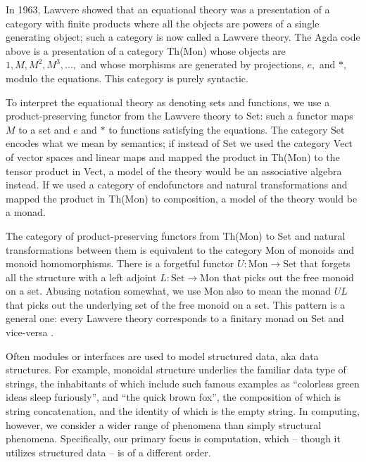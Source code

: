 \documentclass{llncs}
\newcommand{\maps}{\colon}
\newcommand{\Set}{\mathrm{Set}}
\newcommand{\Mon}{\mathrm{Mon}}
\begin{document}
  In 1963, Lawvere \cite{Lawvere} showed that an equational theory was
  a presentation of a category with finite products where all the
  objects are powers of a single generating object; such a category is
  now called a Lawvere theory.  The Agda code above is a presentation
  of a category Th(Mon) whose objects are $1, M, M^2, M^3, \ldots,$
  and whose morphisms are generated by projections, $e,$ and $*,$
  modulo the equations.  This category is purely syntactic.

  To interpret the equational theory as denoting sets and functions,
  we use a product-preserving functor from the Lawvere theory to Set:
  such a functor maps $M$ to a set and $e$ and $*$ to functions
  satisfying the equations.  The category Set encodes what we mean by
  semantics; if instead of Set we used the category Vect of vector
  spaces and linear maps and mapped the product in Th(Mon) to the
  tensor product in Vect, a model of the theory would be an
  associative algebra instead.  If we used a category of endofunctors
  and natural transformations and mapped the product in Th(Mon) to
  composition, a model of the theory would be a monad.

  The category of product-preserving functors from Th(Mon) to Set and
  natural transformations between them is equivalent to the category
  Mon of monoids and monoid homomorphisms.  There is a forgetful
  functor $U\maps \Mon \to \Set$ that forgets all the structure with a
  left adjoint $L\maps \Set \to \Mon$ that picks out the free monoid
  on a set.  Abusing notation somewhat, we use Mon also to mean the
  monad $UL$ that picks out the underlying set of the free monoid on a
  set.  This pattern is a general one: every Lawvere theory
  corresponds to a finitary monad on Set and vice-versa
  \cite{DBLP:journals/entcs/HylandP07}.

  Often modules or interfaces are used to model structured data, aka
  data structures. For example, monoidal structure underlies the
  familiar data type of strings, the inhabitants of which include such
  famous examples as ``colorless green ideas sleep furiously'', and
  ``the quick brown fox'', the composition of which is string
  concatenation, and the identity of which is the empty string. In
  computing, however, we consider a wider range of phenomena than
  simply structural phenomena. Specifically, our primary focus is
  computation, which -- though it utilizes structured data -- is of a
  different order.
\end{document}
